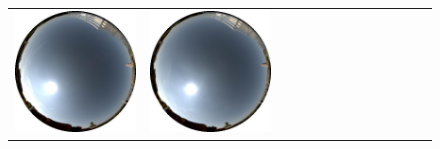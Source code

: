 \begin{figure}
\begin{tabular}{@{}rcccccccccccc@{}}
    \includegraphics[width=\customwidth]{./figures/database/20130824_110040.jpg} &
    \includegraphics[width=\customwidth]{./figures/database/20130824_113038.jpg} &

\end{tabular}
\end{figure}
